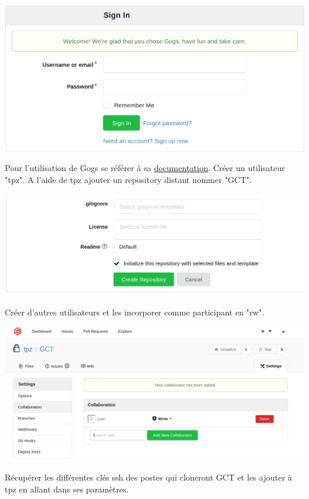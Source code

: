 \documentclass{article}
\begin{document}
\begin{center}
          \includegraphics[scale=0.2]{welcom.png}\smallbreak
\end{center}
      Pour l'utilisation de Gogs se référer à sa \href{https://gogs.io/docs}{documentation}.
      \noindent Créer un utilisateur "tpz". A l'aide de tpz ajouter un repository distant nommer "GCT".
\begin{center}
      \includegraphics[scale=0.2]{initialize.png}\smallbreak
\end{center}
      Créer d'autres utilisateurs et les incorporer comme participant en "rw".\smallbreak
\begin{center}
      \includegraphics[scale=0.2]{collaboration.png}\smallbreak
\end{center}
        Récupérer les différentes clés ssh des postes qui cloneront GCT et les ajouter à tpz en allant dans ses paramètres.
\end{document}
